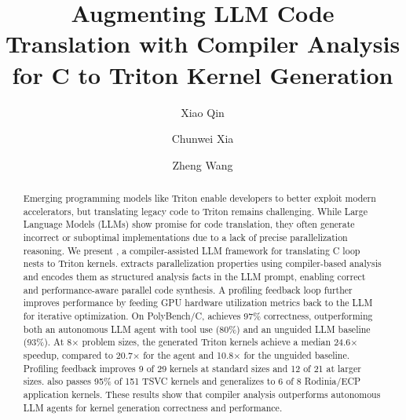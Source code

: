 \documentclass[sigconf]{acmart}
\begin{document}
\title{Augmenting LLM Code Translation with Compiler Analysis for C to Triton Kernel Generation}

\author{Xiao Qin}

\author{Chunwei Xia}

\author{Zheng Wang}




\begin{abstract}
Emerging programming models like Triton enable developers to better exploit modern accelerators, but translating legacy code to Triton remains challenging. While Large Language Models (LLMs) show promise for code translation, they often generate incorrect or suboptimal implementations due to a lack of precise parallelization reasoning.
%
We present \sysname, a compiler-assisted LLM framework for translating C loop nests to Triton kernels. \sysname extracts parallelization properties using compiler-based analysis and encodes them as structured analysis facts in the LLM prompt, enabling correct and performance-aware parallel code synthesis. A profiling feedback loop further improves performance by feeding GPU hardware utilization metrics back to the LLM for iterative optimization.
%
On PolyBench/C, \sysname achieves 97\% correctness, outperforming both an autonomous LLM agent with tool use (80\%) and an unguided LLM baseline (93\%). At 8$\times$ problem sizes, the generated Triton kernels achieve a median 24.6$\times$ speedup, compared to 20.7$\times$ for the agent and 10.8$\times$ for the unguided baseline. Profiling feedback improves 9 of 29 kernels at standard sizes and 12 of 21 at larger sizes. \sysname also passes 95\% of 151 TSVC kernels and generalizes to 6 of 8 Rodinia/ECP application kernels. These results show that compiler analysis outperforms autonomous LLM agents for kernel generation correctness and performance.



\end{abstract}
\end{document}
